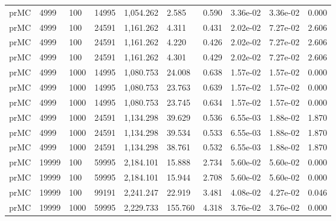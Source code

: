 \begin{tabular}{llllllllll}
prMC &   4999 &        100 &       14995 & 1,054.262 &                        2.585 &          0.590 &         3.36e-02 &        3.36e-02 &        0.000 \\
prMC &   4999 &        100 &       24591 & 1,161.262 &                        4.311 &          0.431 &         2.02e-02 &        7.27e-02 &        2.606 \\
prMC &   4999 &        100 &       24591 & 1,161.262 &                        4.220 &          0.426 &         2.02e-02 &        7.27e-02 &        2.606 \\
prMC &   4999 &        100 &       24591 & 1,161.262 &                        4.301 &          0.429 &         2.02e-02 &        7.27e-02 &        2.606 \\
prMC &   4999 &       1000 &       14995 & 1,080.753 &                       24.008 &          0.638 &         1.57e-02 &        1.57e-02 &        0.000 \\
prMC &   4999 &       1000 &       14995 & 1,080.753 &                       23.763 &          0.639 &         1.57e-02 &        1.57e-02 &        0.000 \\
prMC &   4999 &       1000 &       14995 & 1,080.753 &                       23.745 &          0.634 &         1.57e-02 &        1.57e-02 &        0.000 \\
prMC &   4999 &       1000 &       24591 & 1,134.298 &                       39.629 &          0.536 &         6.55e-03 &        1.88e-02 &        1.870 \\
prMC &   4999 &       1000 &       24591 & 1,134.298 &                       39.534 &          0.533 &         6.55e-03 &        1.88e-02 &        1.870 \\
prMC &   4999 &       1000 &       24591 & 1,134.298 &                       38.761 &          0.532 &         6.55e-03 &        1.88e-02 &        1.870 \\
prMC &  19999 &        100 &       59995 & 2,184.101 &                       15.888 &          2.734 &         5.60e-02 &        5.60e-02 &        0.000 \\
prMC &  19999 &        100 &       59995 & 2,184.101 &                       15.944 &          2.708 &         5.60e-02 &        5.60e-02 &        0.000 \\
prMC &  19999 &        100 &       99191 & 2,241.247 &                       22.919 &          3.481 &         4.08e-02 &        4.27e-02 &        0.046 \\
prMC &  19999 &       1000 &       59995 & 2,229.733 &                      155.760 &          4.318 &         3.76e-02 &        3.76e-02 &        0.000 \\

\end{tabular}
